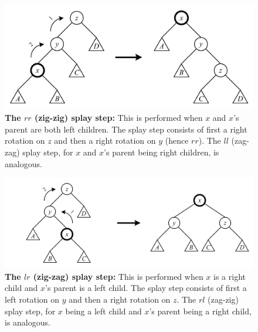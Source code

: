 \documentclass{article}
\begin{document}
\begin{figure}[ht]
\begin{center}
  \includegraphics{dzhang-splaystep-rr.png}
  \caption{\textbf{The $rr$ (zig-zig) splay step:} This is performed when $x$ and
$x$'s parent are both left children. The splay step consists of first
a right rotation on $z$ and then a right rotation on $y$ (hence $rr$).
The $ll$ (zag-zag) splay step, for $x$ and $x$'s parent being right children, is
analogous.}
\label{fig:splaystep_rr}
\end{center}
\end{figure}

\begin{figure}[ht]
\begin{center}
  \includegraphics{dzhang-splaystep-lr.png}
\caption{\textbf{The $lr$ (zig-zag) splay step:} This is performed when $x$ is
a right child and $x$'s parent is a left child. The splay step consists
of first a left rotation on $y$ and then a right rotation on $z$.
The $rl$ (zag-zig) splay step, for $x$ being a left child and $x$'s parent being
a right child, is analogous.}
\label{fig:splaystep_lr}
\end{center}
\end{figure}
\end{document}
